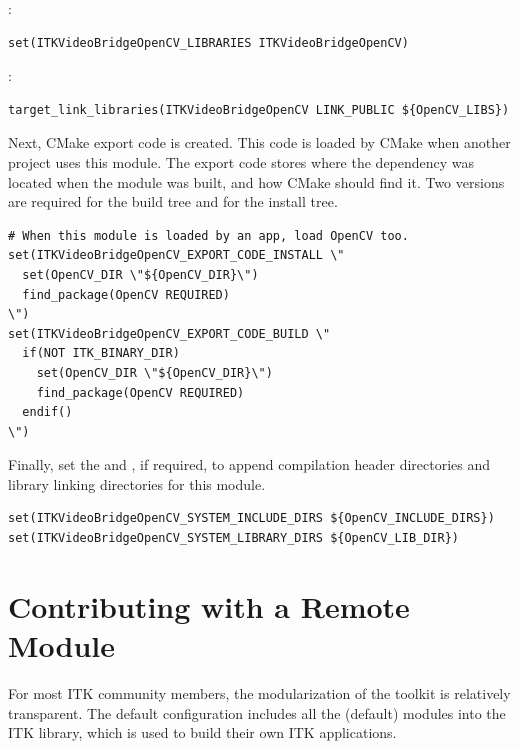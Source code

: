:
\begin{verbatim}
set(ITKVideoBridgeOpenCV_LIBRARIES ITKVideoBridgeOpenCV)
\end{verbatim}

:
\begin{verbatim}
target_link_libraries(ITKVideoBridgeOpenCV LINK_PUBLIC ${OpenCV_LIBS})
\end{verbatim}

Next, CMake export code is created. This code is loaded by CMake when another
project uses this module. The export code stores where the dependency was
located when the module was built, and how CMake should find it. Two versions
are required for the build tree and for the install tree.

\begin{verbatim}
# When this module is loaded by an app, load OpenCV too.
set(ITKVideoBridgeOpenCV_EXPORT_CODE_INSTALL \"
  set(OpenCV_DIR \"${OpenCV_DIR}\")
  find_package(OpenCV REQUIRED)
\")
set(ITKVideoBridgeOpenCV_EXPORT_CODE_BUILD \"
  if(NOT ITK_BINARY_DIR)
    set(OpenCV_DIR \"${OpenCV_DIR}\")
    find_package(OpenCV REQUIRED)
  endif()
\")
\end{verbatim}

Finally, set the  and
, if required, to append
compilation header directories and library linking directories for this
module.

\begin{verbatim}
set(ITKVideoBridgeOpenCV_SYSTEM_INCLUDE_DIRS ${OpenCV_INCLUDE_DIRS})
set(ITKVideoBridgeOpenCV_SYSTEM_LIBRARY_DIRS ${OpenCV_LIB_DIR})
\end{verbatim}

\section{Contributing with a Remote Module}%
\label{sec:ContributingRemoteModules}

For most ITK community members, the modularization of the toolkit is relatively
transparent. The default configuration includes all the (default) modules into
the ITK library, which is used to build their own ITK applications.

